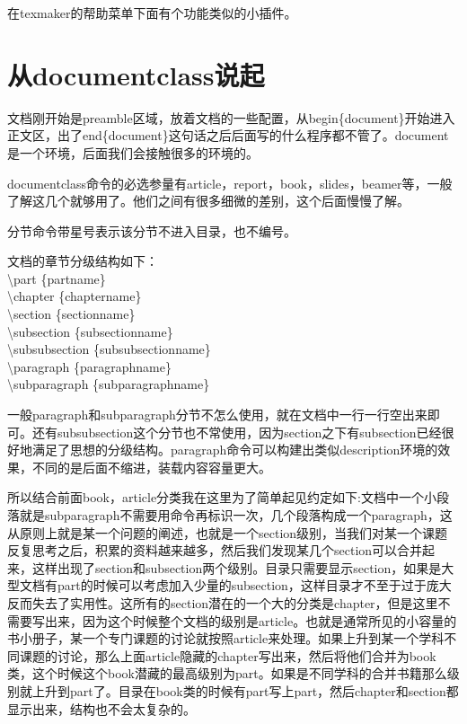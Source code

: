 \documentclass[12pt,oneside]{book}
\begin{document}
\begin{common-format}
在texmaker的帮助菜单下面有个功能类似的小插件。

\section{从documentclass说起}
\label{sec:documentclass}
文档刚开始是preamble区域，放着文档的一些配置，从begin\{document\}开始进入正文区，出了end\{document\}这句话之后后面写的什么程序都不管了。document是一个环境，后面我们会接触很多的环境的。

documentclass命令的必选参量有article，report，book，\linebreak slides，beamer等，一般了解这几个就够用了。他们之间有很多细微的差别，这个后面慢慢了解。

分节命令带星号表示该分节不进入目录，也不编号。

文档的章节分级结构如下：\\
\textbackslash part \{partname\}\\
\textbackslash chapter \{chaptername\}\\
\textbackslash section \{sectionname\}\\
\textbackslash subsection \{subsectionname\}\\
\textbackslash subsubsection \{subsubsectionname\}\\
\textbackslash paragraph \{paragraphname\}\\
\textbackslash subparagraph \{subparagraphname\}

一般paragraph和subparagraph分节不怎么使用，就在文档中一行一行空出来即可。还有subsubsection这个分节也不常使用，因为section之下有subsection已经很好地满足了思想的分级结构。paragraph命令可以构建出类似description环境的效果，不同的是后面不缩进，装载内容容量更大。

所以结合前面book，article分类我在这里为了简单起见约定如下:文档中一个小段落就是subparagraph不需要用命令再标识一次，几个段落构成一个paragraph，这从原则上就是某一个问题的阐述，也就是一个section级别，当我们对某一个课题反复思考之后，积累的资料越来越多，然后我们发现某几个section可以合并起来，这样出现了section和subsection两个级别。目录只需要显示section，如果是大型文档有part的时候可以考虑加入少量的subsection，这样目录才不至于过于庞大反而失去了实用性。这所有的section潜在的一个大的分类是chapter，但是这里不需要写出来，因为这个时候整个文档的级别是article。也就是通常所见的小容量的书小册子，某一个专门课题的讨论就按照article来处理。如果上升到某一个学科不同课题的讨论，那么上面article隐藏的chapter写出来，然后将他们合并为book类，这个时候这个book潜藏的最高级别为part。如果是不同学科的合并书籍那么级别就上升到part了。目录在book类的时候有part写上part，然后chapter和section都显示出来，结构也不会太复杂的。


\end{common-format}
\end{document}
